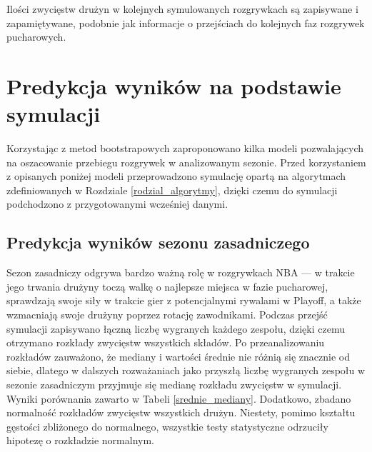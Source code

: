 \documentclass[inzynierska]{pwr_wmat_praca_dyplomowa}
\theoremstyle{plain}
\numberwithin{theorem}{chapter}
\theoremstyle{definition}
\numberwithin{theorem}{chapter}
\begin{document}
Ilości zwycięstw drużyn w kolejnych symulowanych rozgrywkach są zapisywane i zapamiętywane, podobnie jak informacje o przejściach do kolejnych faz rozgrywek pucharowych. 

\section{Predykcja wyników na podstawie symulacji}
Korzystając z metod bootstrapowych zaproponowano kilka modeli pozwalających na oszacowanie przebiegu rozgrywek w analizowanym sezonie.
Przed korzystaniem z opisanych poniżej modeli przeprowadzono symulację opartą na algorytmach zdefiniowanych w Rozdziale \ref{rodzial_algorytmy}, dzięki czemu do symulacji podchodzono z przygotowanymi wcześniej danymi.

\subsection{Predykcja wyników sezonu zasadniczego} \label{predykcja_zasadniczego}
Sezon zasadniczy odgrywa bardzo ważną rolę w rozgrywkach NBA --- w trakcie jego trwania drużyny toczą walkę o najlepsze miejsca w fazie pucharowej, sprawdzają swoje siły w trakcie gier z potencjalnymi rywalami w Playoff, a także wzmacniają swoje drużyny poprzez rotację zawodnikami. Podczas przejść symulacji zapisywano łączną liczbę wygranych każdego zespołu, dzięki czemu otrzymano rozkłady zwycięstw wszystkich składów. Po przeanalizowaniu rozkładów zauważono, że mediany i wartości średnie nie różnią się znacznie od siebie, dlatego w dalszych rozważaniach jako przyszłą liczbę wygranych zespołu w sezonie zasadniczym przyjmuje się medianę rozkładu zwycięstw w symulacji. Wyniki porównania zawarto w Tabeli \ref{srednie_mediany}. Dodatkowo, zbadano normalność rozkładów zwycięstw wszystkich drużyn. Niestety, pomimo kształtu gęstości zbliżonego do normalnego, wszystkie testy statystyczne odrzuciły hipotezę o rozkładzie normalnym.
\end{document}
